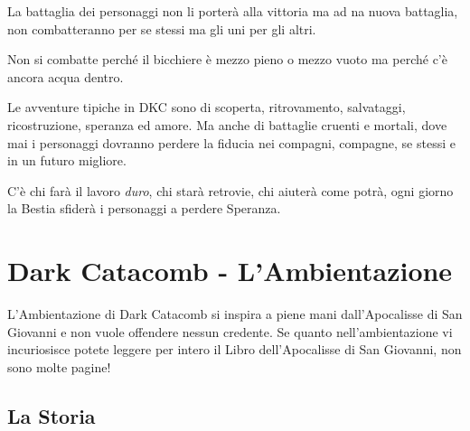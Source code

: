\documentclass[a4paper,twoside,openany]{book}
\begin{document}
La battaglia dei personaggi non li porterà alla vittoria ma ad na nuova battaglia, non combatteranno per se stessi ma gli uni per gli altri.

Non si combatte perché il bicchiere è mezzo pieno o mezzo vuoto ma perché c'è ancora acqua dentro.

Le avventure tipiche in DKC sono di scoperta, ritrovamento, salvataggi, ricostruzione, speranza ed amore. Ma anche di battaglie cruenti e mortali, dove mai i personaggi dovranno perdere la fiducia nei compagni, compagne, se stessi e in un futuro migliore.

C'è chi farà il lavoro \emph{duro}, chi starà retrovie, chi aiuterà come potrà, ogni giorno la Bestia sfiderà i personaggi a perdere Speranza.

\pagebreak

\section{Dark Catacomb - L'Ambientazione}



\begin{narratore}
L'Ambientazione di Dark Catacomb si inspira a piene mani dall'Apocalisse di San Giovanni e non vuole offendere nessun credente. Se quanto nell'ambientazione vi incuriosisce potete leggere per intero il Libro dell'Apocalisse di San Giovanni, non sono molte pagine!

\end{narratore}

\subsection{La Storia}
\end{document}
